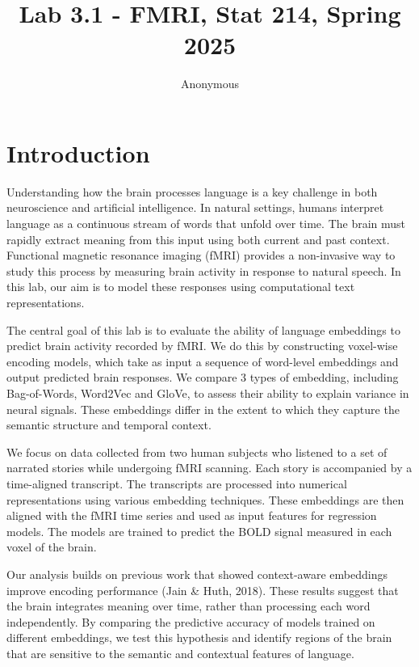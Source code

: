 \documentclass[11pt,letterpaper]{article}
\title{Lab 3.1 - FMRI, Stat 214, Spring 2025\vspace{-1em}}
\author{Anonymous}
\begin{document}
\maketitle

\vspace{1em} %
\section{Introduction}
\vspace{0.5em} %
Understanding how the brain processes language is a key challenge in both neuroscience and artificial intelligence. In natural settings, humans interpret language as a continuous stream of words that unfold over time. The brain must rapidly extract meaning from this input using both current and past context. Functional magnetic resonance imaging (fMRI) provides a non-invasive way to study this process by measuring brain activity in response to natural speech. In this lab, our aim is to model these responses using computational text representations.

The central goal of this lab is to evaluate the ability of language embeddings to predict brain activity recorded by fMRI. We do this by constructing voxel-wise encoding models, which take as input a sequence of word-level embeddings and output predicted brain responses. We compare 3 types of embedding, including Bag-of-Words,  Word2Vec and GloVe, to assess their ability to explain variance in neural signals. These embeddings differ in the extent to which they capture the semantic structure and temporal context.

We focus on data collected from two human subjects who listened to a set of narrated stories while undergoing fMRI scanning. Each story is accompanied by a time-aligned transcript. The transcripts are processed into numerical representations using various embedding techniques. These embeddings are then aligned with the fMRI time series and used as input features for regression models. The models are trained to predict the BOLD signal measured in each voxel of the brain.

Our analysis builds on previous work that showed context-aware embeddings improve encoding performance (Jain \& Huth, 2018). These results suggest that the brain integrates meaning over time, rather than processing each word independently. By comparing the predictive accuracy of models trained on different embeddings, we test this hypothesis and identify regions of the brain that are sensitive to the semantic and contextual features of language.
\end{document}
